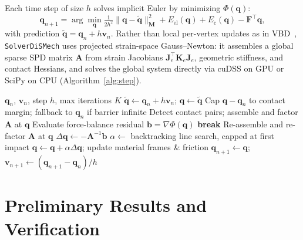 \documentclass[letterpaper, 10 pt, conference]{ieeeconf}
\begin{document}
Each time step of size $h$ solves implicit Euler by minimizing $\Phi(\mathbf{q})$:
\begin{equation}
    \mathbf{q}_{n+1} = \arg\min_{\mathbf{q}} \tfrac{1}{2h^2}\|\mathbf{q} - \tilde{\mathbf{q}}\|^2_\mathbf{M} + E_\text{el}(\mathbf{q}) + E_\text{c}(\mathbf{q}) - \mathbf{F}^\top\mathbf{q},
    \label{eq:ip}
\end{equation}
with prediction $\tilde{\mathbf{q}} = \mathbf{q}_n + h\mathbf{v}_n$.
Rather than local per-vertex updates as in VBD~\cite{chen2024vertex}, \texttt{SolverDiSMech} uses projected strain-space Gauss--Newton: it assembles a global sparse SPD matrix $\mathbf{A}$ from strain Jacobians $\mathbf{J}_e^\top \mathbf{K}_e \mathbf{J}_e$, geometric stiffness, and contact Hessians, and solves the global system directly via cuDSS on GPU or SciPy on CPU (Algorithm~\ref{alg:step}).

\begin{algorithm}[t]
    \caption{\texttt{SolverDiSMech} time step}
    \label{alg:step}
    \begin{algorithmic}[1]
        \Require $\mathbf{q}_n$, $\mathbf{v}_n$, step $h$, max iterations $K$
        \State $\tilde{\mathbf{q}} \gets \mathbf{q}_n + h \mathbf{v}_n$; $\mathbf{q} \gets \tilde{\mathbf{q}}$ 
        \State Cap $\mathbf{q} - \mathbf{q}_n$ to contact margin; fallback to $\mathbf{q}_n$ if barrier infinite
        \State Detect contact pairs; assemble and factor $\mathbf{A}$ at $\mathbf{q}$
            \State Evaluate force-balance residual $\mathbf{b} = \nabla \Phi(\mathbf{q})$
             \textbf{break} \EndIf
                \State Re-assemble and re-factor $\mathbf{A}$ at $\mathbf{q}$
            \EndIf
            \State $\Delta\mathbf{q} \gets -\mathbf{A}^{-1}\mathbf{b}$ 
            \State $\alpha \gets$ backtracking line search, capped at first impact
            \State $\mathbf{q} \gets \mathbf{q} + \alpha\Delta\mathbf{q}$; update material frames \& friction
        \EndFor
        \State $\mathbf{q}_{n+1} \gets \mathbf{q}$; $\mathbf{v}_{n+1} \gets (\mathbf{q}_{n+1} - \mathbf{q}_n)/h$
    \end{algorithmic}
\end{algorithm}

\section{Preliminary Results and Verification}
\end{document}
